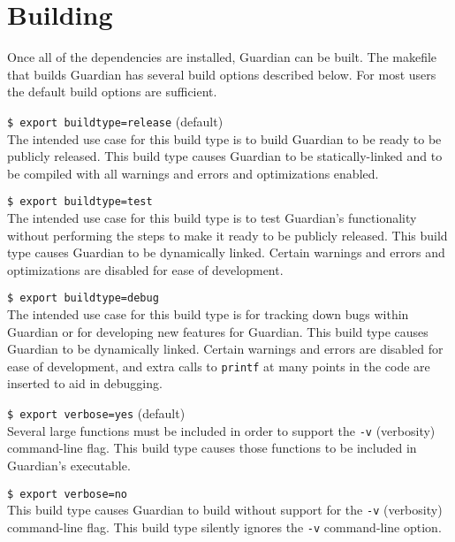 
\section{Building}
{
	Once all of the dependencies are installed, Guardian can be built. The
	makefile that builds Guardian has several build options described below.
	For most users the default build options are sufficient.
	
	\begin{itemize}
	{
		\item {\texttt{\$ export buildtype=release} (default)}\\
		{
			The intended use case for this build type is to build Guardian to be
			ready to be publicly released.
			This build type causes Guardian to be statically-linked and to be
			compiled with all warnings and errors and optimizations enabled.
		}
		
		\item {\texttt{\$ export buildtype=test}}\\
		{
			The intended use case for this build type is to test Guardian's
			functionality without
			performing the steps to make it ready to be publicly released.
			This build type causes Guardian to be dynamically linked.
			Certain warnings and errors and optimizations are disabled for
			ease of development.
		}
		
		\item {\texttt{\$ export buildtype=debug}}\\
		{
			The intended use case for this build type is for tracking down
			bugs within Guardian or for developing new features for Guardian.
			This build type causes Guardian to be dynamically linked. Certain
			warnings and errors
			are disabled for ease of development, and extra calls to
			\texttt{printf}
			at many points in the code are inserted to aid in debugging.
		}
		
		\item {\texttt{\$ export verbose=yes} (default)}\\
		{
			Several large functions must be included in order to support the
			\texttt{-v} (verbosity) command-line flag. This build
			type causes those
			functions to be included in Guardian's executable.
		}
		
		\item {\texttt{\$ export verbose=no}}\\
		{
			This build type causes Guardian to build without support for the
			\texttt{-v} (verbosity) command-line flag. This build type
			silently ignores the \texttt{-v} command-line option.
		}
		
}
\end{itemize}}
